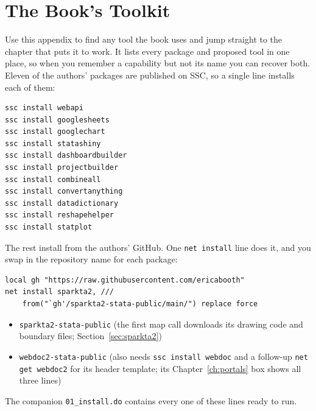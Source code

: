 \chapter{The Book's Toolkit}\label{app:toolkit}
Use this appendix to find any tool the book uses and jump straight to the chapter that puts it to work. It lists every package and proposed tool in one place, so when you remember a capability but not its name you can recover both. Eleven of the authors' packages are published on SSC, so a single line installs each of them:
\par
{\footnotesize
\begin{verbatim}
ssc install webapi
ssc install googlesheets
ssc install googlechart
ssc install statashiny
ssc install dashboardbuilder
ssc install projectbuilder
ssc install combineall
ssc install convertanything
ssc install datadictionary
ssc install reshapehelper
ssc install statplot
\end{verbatim}
}
The rest install from the authors' GitHub. One \texttt{net install} line does it, and you swap in the repository name for each package:
\par
{\footnotesize
\begin{verbatim}
local gh "https://raw.githubusercontent.com/ericabooth"
net install sparkta2, ///
    from("`gh'/sparkta2-stata-public/main/") replace force
\end{verbatim}
}
\begin{itemize}
    \item \texttt{sparkta2-stata-public} (the first map call downloads its drawing code and boundary files; Section~\ref{sec:sparkta2})
    \item \texttt{webdoc2-stata-public} (also needs \texttt{ssc install webdoc} and a follow-up \texttt{net get webdoc2} for its header template; its Chapter~\ref{ch:portals} box shows all three lines)
\end{itemize}
The companion \texttt{01\_install.do} contains every one of these lines ready to run.

